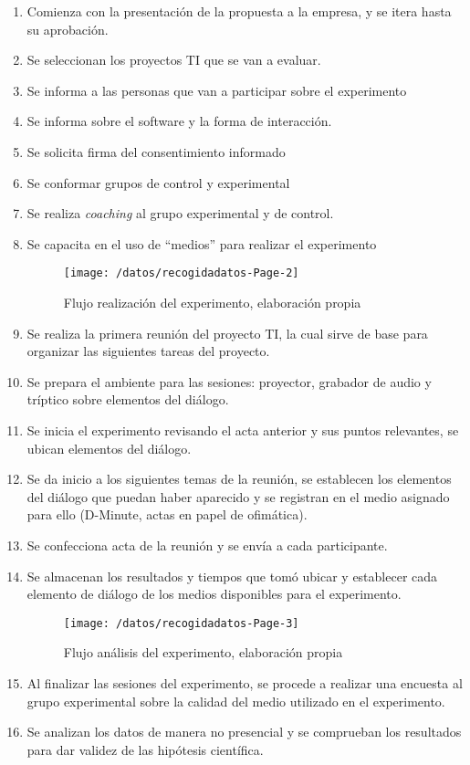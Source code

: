 \begin{enumerate}[1.]
	\item Comienza con la presentación de la propuesta a la empresa, y se itera hasta su aprobación.
	\item Se seleccionan los proyectos TI que se van a evaluar.
	\item Se informa a las personas que van a participar sobre el experimento 
	\item Se informa sobre el software y la forma de interacción.
	\item Se solicita firma del consentimiento informado
	\item Se conformar grupos de control y experimental
	\item Se realiza \textit{coaching} al grupo experimental y de control.
	\item Se capacita en el uso de “medios” para realizar el experimento

\begin{figure}[!h]
\centering
\texttt{[image: /datos/recogidadatos-Page-2]}
\caption{Flujo realización del experimento,  elaboración propia} 
\label{img5-3}
\end{figure}

	\item Se realiza la primera reunión del proyecto TI, la cual sirve de base para organizar las siguientes tareas del proyecto.
	\item Se prepara el ambiente para las sesiones: proyector, grabador de audio y tríptico sobre elementos del diálogo.
	\item Se inicia el experimento revisando el acta anterior y sus puntos relevantes, se ubican elementos del diálogo.
	\item Se da inicio a los siguientes temas de la reunión, se establecen los elementos del diálogo que puedan haber aparecido y se registran en el medio asignado para ello (D-Minute, actas en papel de ofimática).
	\item Se confecciona acta de la reunión y se envía a cada participante.
	\item Se almacenan los resultados y tiempos que tomó ubicar y establecer cada elemento de diálogo de los medios disponibles para el experimento.

\begin{figure}[!h]
\centering
\texttt{[image: /datos/recogidadatos-Page-3]}
\caption{Flujo análisis del experimento,  elaboración propia} 
\label{img5-4}
\end{figure}

	\item Al finalizar las sesiones del experimento, se procede a realizar una encuesta al grupo experimental sobre la calidad del medio utilizado en el experimento.
	\item Se analizan los datos de manera no presencial y se comprueban los resultados para dar validez de las hipótesis científica.

\end{enumerate}

